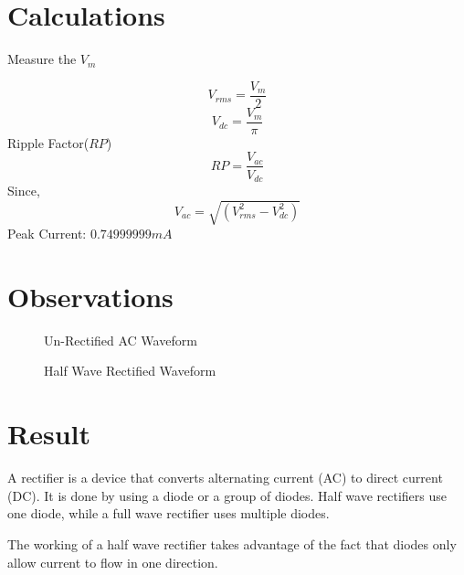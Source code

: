 	\section{Calculations}	
		Measure the $V_m$
		
		$$V_{rms}= \frac{V_m}{2}$$
		$$V_{dc}= \frac{V_m} {\pi}$$
		Ripple Factor($RP$)$$RP = \frac{V_{ac}}{V_{dc}}$$
		Since, $$V_{ac}=\sqrt{(V^2_{rms}-V^2_{dc})}$$		
		Peak Current: $0.74999999 mA$
		
	\section{Observations}
		\begin{figure}[h]
			\centering
			\caption{Un-Rectified AC Waveform}
		\end{figure}
		\begin{figure}[h]
			\centering
			\caption{Half Wave Rectified Waveform}
		\end{figure}
	
	\section{Result}
		A rectifier is a device that converts alternating current (AC) to direct current (DC). It is done by using a diode or a group of diodes. Half wave rectifiers use one diode, while a full wave rectifier uses multiple diodes.
		
		The working of a half wave rectifier takes advantage of the fact that diodes only allow current to flow in one direction.
			